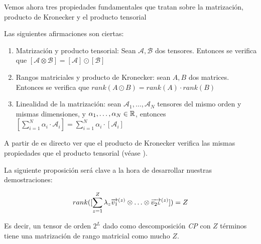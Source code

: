Vemos ahora tres propiedades fundamentales que tratan sobre la matrización, producto de Kronecker y el producto tensorial

\begin{proposicion} Las siguientes afirmaciones son ciertas:

    \begin{enumerate}
        \item Matrización y producto tensorial: Sean $\mathcal{A}, \mathcal{B}$ dos tensores. Entonces se verifica que $[\mathcal{A} \otimes \mathcal{B}] = [\mathcal{A}] \odot [\mathcal{B}]$ \label{prop:prop_fundamentales_primera}
        \item Rangos matriciales y producto de Kronecker: sean $A, B$ dos matrices. Entonces se verifica que $rank(A \odot B) = rank(A) \cdot rank(B)$
        \item Linealidad de la matrización: sean $\mathcal{A}_1, \ldots, \mathcal{A}_N$ tensores del mismo orden y mismas dimensiones, y $\alpha_1, \ldots, \alpha_N \in \mathbb{R}$, entonces $[\sum_{i = 1}^N \alpha_i \cdot \mathcal{A}_i] = \sum_{i = 1}^N \alpha_i \cdot [\mathcal{A}_i]$
    \end{enumerate}

\end{proposicion}

\begin{observacion} A partir de  es directo ver que el producto de Kronecker verifica las mismas propiedades que el producto tensorial (véase ).
\end{observacion}

La siguiente proposición será clave a la hora de desarrollar nuestras demostraciones:

\begin{proposicion} \label{prop:rango_matricial_descomp_cp}

    \begin{equation}
        rank([\sum_{z = 1}^Z \lambda_z \overrightarrow{v_1}^{(z)} \otimes \ldots \otimes \overrightarrow{v_{2^L}}^{(z)}]) = Z
    \end{equation}

    Es decir, un tensor de orden $2^L$ dado como descomposición \textit{CP} con $Z$ términos tiene una matrización de rango matricial como mucho $Z$.

\end{proposicion}

